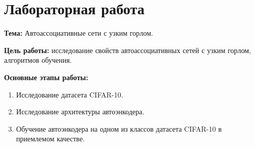 \section*{Лабораторная работа }

{\bfseries Тема:} Автоассоциативные сети с узким горлом.

{\bfseries Цель работы:} исследование свойств автоассоциативных сетей с узким горлом, алгоритмов обучения.

{\bfseries Основные этапы работы:}
\begin{enumerate}
	\item Исследование датасета CIFAR-10.
	\item Исследование архитектуры автоэнкодера.
	\item Обучение автоэнкодера на одном из классов датасета CIFAR-10 в приемлемом качестве.
\end{enumerate}

\pagebreak

